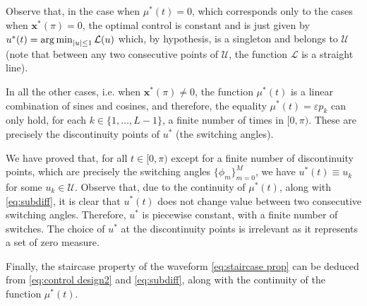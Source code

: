 \documentclass[twocolumn]{autart}    %
\begin{document}
Observe that, in the case when $\mu^\ast(t) = 0$, which corresponds only to the cases when $\bm{x}^\ast(\pi) = 0$, the optimal control is constant and is just given by  $u^\ast (t) =  \operatorname*{arg\,min}_{|u|\leq 1} \mathcal{L}(u)$ which, by hypothesis, is a singleton and belongs to $\mathcal{U}$ (note that between any two consecutive points of $\mathcal{U}$, the function $\mathcal{L}$ is a straight line).

In all the other cases,  i.e. when $\bm{x}^\ast(\pi)\neq 0$,  
the function $\mu^\ast(t)$ is a linear combination of sines and cosines, and therefore, the equality
$\mu^\ast (t) = \varepsilon p_k$ can
only hold, for each $k\in \{  1, \ldots, L-1 \}$, a finite number of times in $[0,\pi)$.
These are precisely the discontinuity points of $u^\ast$ (the switching angles).

We have proved that, for all $t\in [0,\pi)$ except for a finite number of discontinuity points, which are precisely the switching angles $\{\phi_m\}_{m=0}^M$, we have $u^\ast(t)\equiv u_k$ for some $u_k\in\mathcal U$. 
Observe that, due to the continuity of $\mu^\ast(t)$, along with \eqref{eq:subdiff}, it is clear that $u^\ast(t)$ does not change value between two consecutive switching angles. Therefore, $u^\ast$ is piecewise constant, with a finite number of switches.
The choice of $u^\ast$ at the discontinuity points is irrelevant as it represents a set of zero measure.

Finally, the staircase property of the waveform \eqref{eq:staircase prop} can be deduced from \eqref{eq:control design2} and \eqref{eq:subdiff}, along with the continuity of the function $\mu^\ast(t)$.
\end{document}
